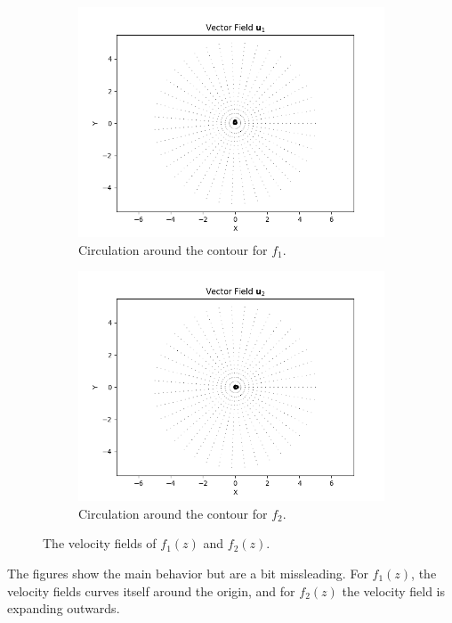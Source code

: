 \documentclass{article}
\begin{document}
\begin{figure}[H]
    \centering
    \begin{subfigure}[b]{0.45\textwidth}
        \includegraphics[scale = 0.4]{task3_f1_cir.png}
        \caption{Circulation around the contour for $f_1$.}
        \label{fig:3_2_1}
    \end{subfigure}
    \hfill
    \begin{subfigure}[b]{0.45\textwidth}
        \includegraphics[scale = 0.4]{task3_f2_cir.png}
        \caption{Circulation around the contour for $f_2$.}
        \label{fig:3_2_2}
    \end{subfigure}
    \caption{The velocity fields of $f_1(z)$ and $f_2(z)$.}
\end{figure}\noindent
The figures show the main behavior but are a bit missleading. For $f_1(z)$, the velocity fields curves itself around the origin, and for $f_2(z)$ the velocity field is expanding outwards.
\end{document}

